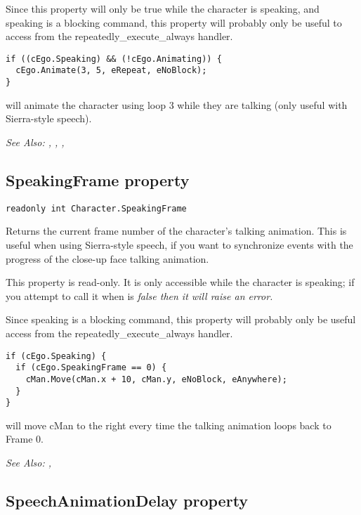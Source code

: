Since this property will only be true while the character is speaking, and speaking is
a blocking command, this property will probably only be useful to access from
the repeatedly_execute_always handler.

\begin{verbatim}
if ((cEgo.Speaking) && (!cEgo.Animating)) {
  cEgo.Animate(3, 5, eRepeat, eNoBlock);
}
\end{verbatim}
will animate the character using loop 3 while they are talking (only useful with Sierra-style speech).

\it{See Also:} ,
,
,


\subsection{SpeakingFrame property}\label{Character.SpeakingFrame}%

\begin{verbatim}
readonly int Character.SpeakingFrame
\end{verbatim}
Returns the current frame number of the character's talking animation. This is
useful when using Sierra-style speech, if you want to synchronize events with the
progress of the close-up face talking animation.

This property is read-only. It is only accessible while the character is speaking;
if you attempt to call it when  is
\it{false} then it will raise an error.

Since speaking is a blocking command, this property will probably only be useful
access from the repeatedly_execute_always handler.

\begin{verbatim}
if (cEgo.Speaking) {
  if (cEgo.SpeakingFrame == 0) {
    cMan.Move(cMan.x + 10, cMan.y, eNoBlock, eAnywhere);
  }
}
\end{verbatim}
will move cMan to the right every time the talking animation loops back to Frame 0.

\it{See Also:} ,


\subsection{SpeechAnimationDelay property}\label{Character.SpeechAnimationDelay}%

